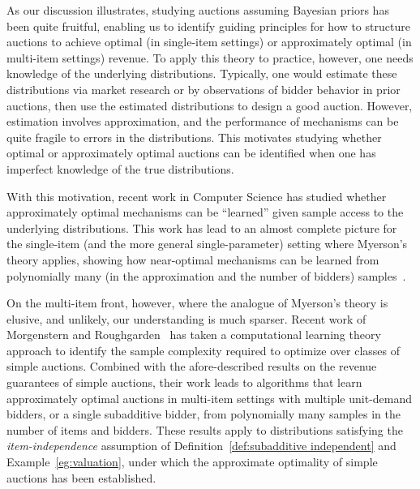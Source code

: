 \medskip As our discussion illustrates, studying auctions assuming Bayesian priors has been quite fruitful, enabling us to identify guiding principles for how to structure auctions to achieve optimal (in single-item settings) or approximately optimal (in multi-item settings) revenue. To apply this theory to practice, however, one needs knowledge of the underlying distributions. Typically, one would estimate these distributions via market research or by observations of bidder behavior in prior auctions, then use the estimated distributions to design a good auction. However, estimation  involves approximation, and the performance of mechanisms can be quite fragile to errors in the distributions. This motivates studying whether optimal or approximately optimal auctions can be identified when one has imperfect knowledge of the true distributions.

With this motivation, recent work in Computer Science has studied whether approximately optimal mechanisms can be ``learned'' given sample access to the underlying distributions. This work has lead to an almost complete picture for the single-item (and the more general single-parameter) setting where Myerson's theory applies, showing how near-optimal mechanisms can be learned from polynomially many (in the approximation and the number of bidders) samples~\cite{Elkind07,ColeR14,MohriM14,HuangMR15,MorgensternR15,DevanurHP16,RoughgardenS16,GonczarowskiN16}. 

On the multi-item front, however, where the analogue of Myerson's theory is elusive, and unlikely, our understanding is much sparser. Recent work of Morgenstern and Roughgarden~\cite{MorgensternR16} has taken a computational learning theory approach to identify the sample complexity required to optimize over classes of simple auctions. Combined with the afore-described results on the revenue guarantees of simple auctions, their work leads to algorithms that learn approximately optimal auctions in multi-item settings with multiple unit-demand bidders, or a single subadditive bidder, from polynomially many samples in the number of items and bidders. These results apply to distributions satisfying the {\em item-independence} assumption of Definition~\ref{def:subadditive independent} and Example~\ref{eg:valuation}, under which the approximate optimality of simple auctions has been established.
 
